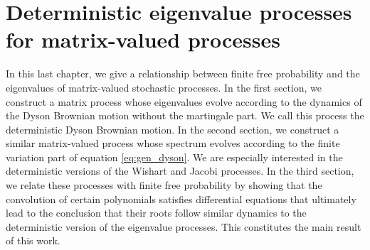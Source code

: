 \chapter{Deterministic eigenvalue processes for matrix-valued processes}

In this last chapter, we give a relationship between finite free probability and the eigenvalues of matrix-valued stochastic processes. In the first section, we construct a matrix process whose eigenvalues evolve according to the dynamics of the Dyson Brownian motion without the martingale part. We call this process the deterministic Dyson Brownian motion. In the second section, we construct a similar matrix-valued process whose spectrum evolves according to the finite variation part of equation \eqref{eq:gen_dyson}. We are especially interested in the deterministic versions of the Wishart and Jacobi processes. In the third section, we relate these processes with finite free probability by showing that the convolution of certain polynomials satisfies differential equations that ultimately lead to the conclusion that their roots follow similar dynamics to the deterministic version of the eigenvalue processes. This constitutes the main result of this work.

\label{ch:determinist}





